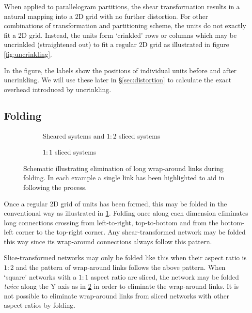 			When applied to parallelogram partitions, the shear transformation
			results in a natural mapping into a 2D grid with no further distortion.
			For other combinations of transformation and partitioning scheme, the
			units do not exactly fit a 2D grid. Instead, the units form `crinkled'
			rows or columns which may be uncrinkled (straightened out) to fit a
			regular 2D grid as illustrated in figure \ref{fig:uncrinkling}.
			
			In the figure, the labels show the positions of individual units before
			and after uncrinkling. We will use these later in \S\ref{sec:distortion}
			to calculate the exact overhead introduced by uncrinkling.
		
		\subsection{Folding}
			
			\begin{figure}
				\begin{subfigure}{\linewidth}
					\center
					\caption{Sheared systems and $1:2$ sliced systems}
					\label{fig:folding-sheared}
				\end{subfigure}
				
				\vspace{1em}
				
				\begin{subfigure}{\linewidth}
					\center
					\caption{$1:1$ sliced systems}
					\label{fig:folding-sliced}
				\end{subfigure}
				
				\caption{Schematic illustrating elimination of long wrap-around links
				during folding. In each example a single link has been highlighted to
				aid in following the process.}
				\label{fig:folding}
			\end{figure}
			
			Once a regular 2D grid of units has been formed, this may be folded in
			the conventional way as illustrated in \ref{fig:folding-sheared}. Folding
			once along each dimension eliminates long connections crossing from
			left-to-right, top-to-bottom and from the bottom-left corner to the
			top-right corner. Any shear-transformed network may be folded this way
			since its wrap-around connections always follow this pattern.
			
			Slice-transformed networks may only be folded like this when their aspect
			ratio is $1:2$ and the pattern of wrap-around links follows the above
			pattern. When `square' networks with a $1:1$ aspect ratio are sliced, the
			network may be folded \emph{twice} along the Y axis as in
			\ref{fig:folding-sliced} in order to eliminate the wrap-around links. It
			is not possible to eliminate wrap-around links from sliced networks with
			other aspect ratios by folding.
			
